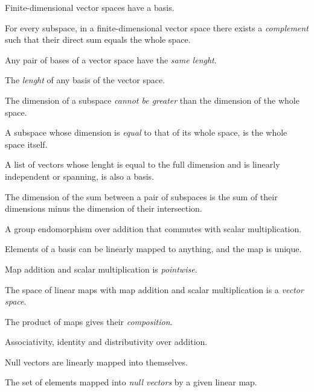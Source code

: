\begin{multicols}{3}
  Finite-dimensional vector spaces have a basis.
  
  For every subspace, in a finite-dimensional vector space there exists a \textit{complement} such that their direct sum equals the whole space.
  
  Any pair of bases of a vector space have the \textit{same lenght}.
  
  The \textit{lenght} of any basis of the vector space.
  
  The dimension of a subspace \textit{cannot be greater} than the dimension of the whole space.
  
  A subspace whose dimension is \textit{equal} to that of its whole space, is the whole space itself.
  
  A list of vectors whose lenght is equal to the full dimension and is linearly independent or spanning, is also a basis.
  
  The dimension of the sum between a pair of subspaces is the sum of their dimensions minus the dimension of their intersection.

  A group endomorphism over addition that commutes with scalar multiplication.

  Elements of a basis can be linearly mapped to anything, and the map is unique.

  Map addition and scalar multiplication is \textit{pointwise}.
  
  The space of linear maps with map addition and scalar multiplication is a \textit{vector space}.

  The product of maps gives their \textit{composition}.

  Associativity, identity and distributivity over addition.

  Null vectors are linearly mapped into themselves.

  The set of elements mapped into \textit{null vectors} by a given linear map.


\end{multicols}
